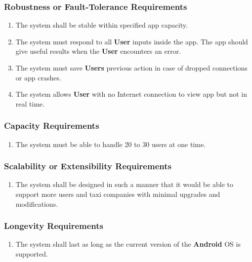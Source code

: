 \documentclass[english]{article}
\begin{document}
\subsubsection{Robustness or Fault-Tolerance Requirements}
\label{ssub:robustness_or_fault_tolerance_requirements}
\begin{enumerate}[{RFR}1. ]
	\item The system shall be stable within specified app capacity.
	\item The system must respond to all \textbf{User} inputs inside the app. The app should give useful results when the \textbf{User} encounters an error.
	\item The system must save \textbf{Users} previous action in case of dropped connections or app crashes.
	\item The system allows \textbf{User} with no Internet connection to view app but not in real time. 
\end{enumerate}

\subsubsection{Capacity Requirements}
\label{ssub:capacity_requirements}
\begin{enumerate}[{CR}1. ]
	\item The system must be able to handle 20 to 30 users at one time. 
\end{enumerate}

\subsubsection{Scalability or Extensibility Requirements}
\label{ssub:scalability_or_extensibility_requirements}
\begin{enumerate}[{SER}1. ]
	\item The system shall be designed in such a manner that it would be able to support more users and taxi companies with minimal upgrades and modifications.
\end{enumerate}

\subsubsection{Longevity Requirements}
\label{ssub:longevity_requirements}
\begin{enumerate}[{LONGR}1. ]
	\item The system shall last as long as the current version of the  \textbf{Android} OS is supported.
\end{enumerate}
\end{document}
